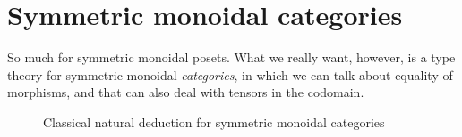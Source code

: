 \documentclass{book}
\let\types\vdash
\def\type{\;\ftype}
\def\one{\mathbf{1}}
\let\tensor\otimes
\def\tensorI{\mathord{\tensor}I}
\def\tensorE{\mathord{\tensor}E}
\begin{document}
\section{Symmetric monoidal categories}
\label{sec:prop-smc}

So much for symmetric monoidal posets.
What we really want, however, is a type theory for symmetric monoidal \emph{categories}, in which we can talk about equality of morphisms, and that can also deal with tensors in the codomain.

\begin{figure}
  \centering
  \caption{Classical natural deduction for symmetric monoidal categories}
  \label{fig:clnatded-smc}
\end{figure}
\end{document}
